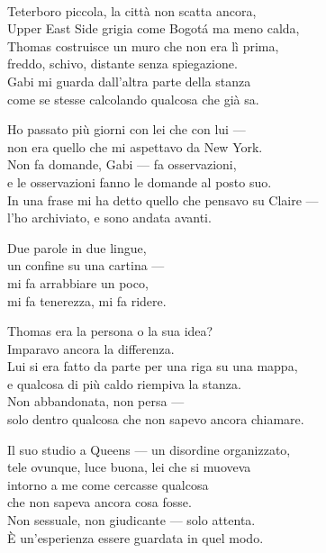 \begin{lyrics}

\\
Teterboro piccola, la città non scatta ancora,\\
Upper East Side grigia come Bogotá ma meno calda,\\
Thomas costruisce un muro che non era lì prima,\\
freddo, schivo, distante senza spiegazione.\\
Gabi mi guarda dall'altra parte della stanza\\
come se stesse calcolando qualcosa che già sa.

Ho passato più giorni con lei che con lui —\\
non era quello che mi aspettavo da New York.\\
Non fa domande, Gabi — fa osservazioni,\\
e le osservazioni fanno le domande al posto suo.\\
In una frase mi ha detto quello che pensavo su Claire —\\
l'ho archiviato, e sono andata avanti.

Due parole in due lingue,\\
un confine su una cartina —\\
mi fa arrabbiare un poco,\\
mi fa tenerezza, mi fa ridere.

Thomas era la persona o la sua idea?\\
Imparavo ancora la differenza.\\
Lui si era fatto da parte per una riga su una mappa,\\
e qualcosa di più caldo riempiva la stanza.\\
Non abbandonata, non persa —\\
solo dentro qualcosa che non sapevo ancora chiamare.

Il suo studio a Queens — un disordine organizzato,\\
tele ovunque, luce buona, lei che si muoveva\\
intorno a me come cercasse qualcosa\\
che non sapeva ancora cosa fosse.\\
Non sessuale, non giudicante — solo attenta.\\
È un'esperienza essere guardata in quel modo.


\end{lyrics}
